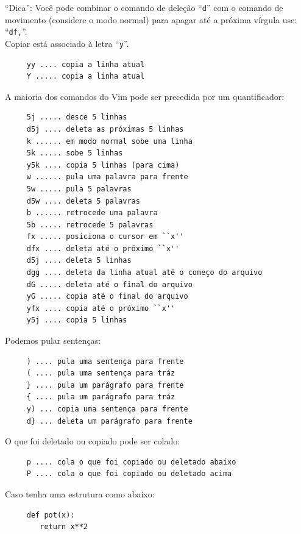 \documentclass[10pt,a4paper,openany]{book}
\begin{document}
``Dica'': Você pode combinar o comando de deleção ``\verb+d+'' com o
comando de movimento (considere o modo normal) para apagar até a
próxima vírgula use: ``\verb+df,+''. \\


Copiar está associado à letra ``\verb|y|''.

\begin{verbatim}
     yy .... copia a linha atual
     Y ..... copia a linha atual
\end{verbatim}

A maioria dos comandos do Vim pode ser precedida por um quantificador:

\begin{verbatim}
     5j ..... desce 5 linhas
     d5j .... deleta as próximas 5 linhas
     k ...... em modo normal sobe uma linha
     5k ..... sobe 5 linhas
     y5k .... copia 5 linhas (para cima)
     w ...... pula uma palavra para frente
     5w ..... pula 5 palavras
     d5w .... deleta 5 palavras
     b ...... retrocede uma palavra
     5b ..... retrocede 5 palavras
     fx ..... posiciona o cursor em ``x''
     dfx .... deleta até o próximo ``x''
     d5j .... deleta 5 linhas
     dgg .... deleta da linha atual até o começo do arquivo
     dG ..... deleta até o final do arquivo
     yG ..... copia até o final do arquivo
     yfx .... copia até o próximo ``x''
     y5j .... copia 5 linhas
\end{verbatim}

Podemos pular sentenças:

\begin{verbatim}
     ) .... pula uma sentença para frente
     ( .... pula uma sentença para tráz
     } .... pula um parágrafo para frente
     { .... pula um parágrafo para tráz
     y) ... copia uma sentença para frente
     d} ... deleta um parágrafo para frente
\end{verbatim}

O que foi deletado ou copiado pode ser colado:

\begin{verbatim}
     p .... cola o que foi copiado ou deletado abaixo
     P .... cola o que foi copiado ou deletado acima
\end{verbatim}

Caso tenha uma estrutura como abaixo:

\begin{verbatim}
     def pot(x):
        return x**2
\end{verbatim}
\end{document}
